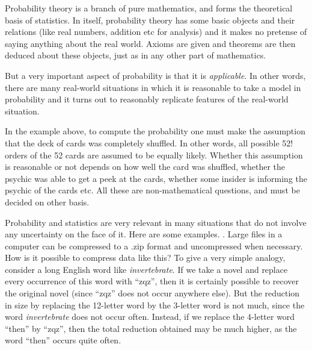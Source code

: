 \documentclass[preprint,  11pt]{amsart}
\begin{document}
\vspace{4mm}
 Probability theory is a branch of pure mathematics, and forms the theoretical basis of statistics. In itself, probability theory has some basic objects and their relations (like real numbers, addition etc for analysis) and it makes no pretense of saying anything about the real world. Axioms are given and theorems are then deduced about these objects, just as in any other part of mathematics.

But a very important aspect of probability is that it is {\em applicable}. In other words, there are many real-world situations in which it is reasonable to take a model in probability and it turns out to reasonably replicate features of  the real-world situation.

In the example above, to compute the probability one must make the assumption that the deck of cards was completely shuffled. In other words, all possible 52! orders of the 52 cards are assumed to be equally likely. Whether this assumption is reasonable or not depends on how well the card was shuffled, whether the psychic was able to get a peek at the cards, whether some insider is informing the psychic of the cards etc. All these are non-mathematical questions, and must be decided on other basis.

 Probability and statistics are very relevant in many situations that do not involve any uncertainty on the face of it. Here are some examples.
. Large files in a computer can be compressed to a .zip format and uncompressed when necessary. How is it possible to compress data like this? To give a very simple analogy, consider a long English word like {\em invertebrate}. If we take a novel and replace every occurrence of this word with ``zqz'', then  it is certainly possible to recover the original novel (since ``zqz'' does not occur anywhere else). But the reduction in size by replacing the 12-letter word by the 3-letter word is not much, since the word {\em invertebrate} does not occur often. Instead, if we replace the 4-letter word ``then'' by ``zqz'', then the total reduction obtained may be much higher, as the word ``then'' occurs quite often.
\end{document}
